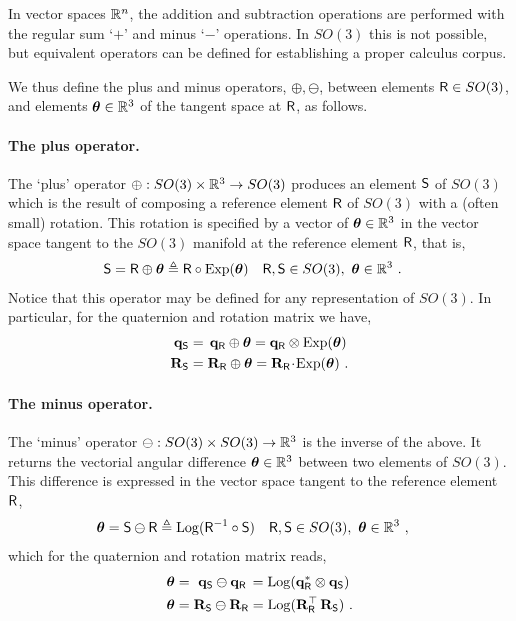 In vector spaces ${\mathbb R}^n$, the addition and subtraction operations are performed with the regular sum `$+$' and minus `$-$' operations.
In $SO(3)$ this is not possible, but equivalent operators can be defined for establishing a proper calculus corpus. 

We thus define the plus and minus operators, $\oplus,\ominus$, between elements $\mathsf R\in SO(3)$, and elements ${\bm \theta}\in{\mathbb R}^3$ of the tangent space at $\mathsf R$, as follows.

\paragraph{The plus operator.}
The `plus' operator $\oplus:SO(3)\times{\mathbb R}^3\to SO(3)$ produces an element $\mathsf S$ of $SO(3)$ which is the result of composing a reference element $\mathsf R$ of $SO(3)$ with a (often small) rotation. This rotation is specified by a vector of ${\bm \theta}\in{\mathbb R}^3$ in the vector space tangent to the $SO(3)$ manifold at the reference element $\mathsf R$, that is,
%
\begin{align}
\mathsf S = \mathsf R\oplus {\bm \theta} &\triangleq \mathsf R\circ\operatorname*{Exp}({\bm \theta}) && \mathsf R,\mathsf S\in SO(3),~ {\bm \theta}\in{\mathbb R}^3 
~.
\end{align}
%
Notice that this operator may be defined for any representation of $SO(3)$. In particular, for the quaternion and rotation matrix we have,
%
\begin{align}
{\bf q}_\mathsf S &= \,{\bf q}_\mathsf R\oplus{\bm \theta} = {\bf q}_\mathsf R\otimes\operatorname*{Exp}({\bm \theta}) \\
{\bf R}_\mathsf S &= {\bf R}_\mathsf R\oplus {\bm \theta} = {\bf R}_\mathsf R\!\cdot\!\operatorname*{Exp}({\bm \theta}) 
~.
\end{align}

\paragraph{The minus operator.}
The `minus' operator $\ominus:SO(3)\times SO(3)\to{\mathbb R}^3$ is the inverse of the above. It returns the vectorial angular difference ${\bm \theta}\in{\mathbb R}^3$ between two elements of $SO(3)$. This difference is expressed in the  vector space tangent to the reference element $\mathsf R$, 
%
\begin{align}
{\bm \theta}=\mathsf S\ominus \mathsf R
&\triangleq \operatorname*{Log}(\mathsf R^{-1} \circ \mathsf S)     && \mathsf R,\mathsf S\in SO(3),~ {\bm \theta}\in{\mathbb R}^3  
~,
\end{align}
%
which for the quaternion and rotation matrix reads,
%
\begin{align}
{\bm \theta} &= \,\,{\bf q}_\mathsf S\ominus{\bf q}_\mathsf R\, = \operatorname*{Log}({\bf q}_\mathsf R^*\otimes{\bf q}_\mathsf S)                      \\
{\bm \theta} &= {\bf R}_\mathsf S\ominus{\bf R}_\mathsf R = \operatorname*{Log}({\bf R}_\mathsf R^{\top}\,{\bf R}_\mathsf S)
~.
\end{align}

